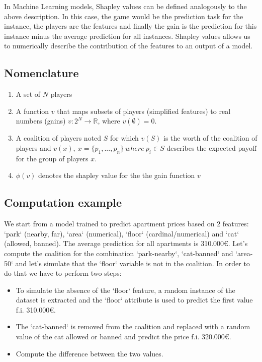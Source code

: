 In Machine Learning models, Shapley values can be defined analogously to the above description. In this case, the game would be the prediction task for the instance, the players are the features and finally the gain is the prediction for this instance minus the average prediction for all instances. Shapley values allows us to numerically describe the contribution of the features to an output of a model.

\subsection{Nomenclature}

\begin{enumerate}
    \item A set of $N$ players
    \item A function $v$ that maps subsets of players (simplified features) to real numbers (gains)  $v : 2^N \rightarrow \mathbb {R}$, where $v(\emptyset) = 0$.
    \item A coalition of players noted $S$ for which $v(S)$ is the worth of the coalition of players and $v(x),\ x=\{p_1, ..., p_n\}\ where\ p_i \in S$ describes the expected payoff for the group of players $x$.
    \item $\phi(v)$ denotes the shapley value for the the gain function $v$
\end{enumerate}

\subsection{Computation example}

We start from a model trained to predict apartment prices based on 2 features: `park` (nearby, far), `area` (numerical), `floor` (cardinal/numerical) and `cat` (allowed, banned). The average prediction for all apartments is 310.000€. Let's compute the coalition for the combination `park-nearby`, `cat-banned` and `area-50` and let's simulate that the `floor` variable is not in the coalition. In order to do that we have to perform two steps:
\begin{itemize}
    \item To simulate the absence of the `floor` feature, a random instance of the dataset is extracted and the `floor` attribute is used to predict the first value f.i. 310.000€.
    \item The `cat-banned` is removed from the coalition and replaced with a random value of the cat allowed or banned and predict the price f.i. 320.000€.
    \item Compute the difference between the two values.
\end{itemize}

